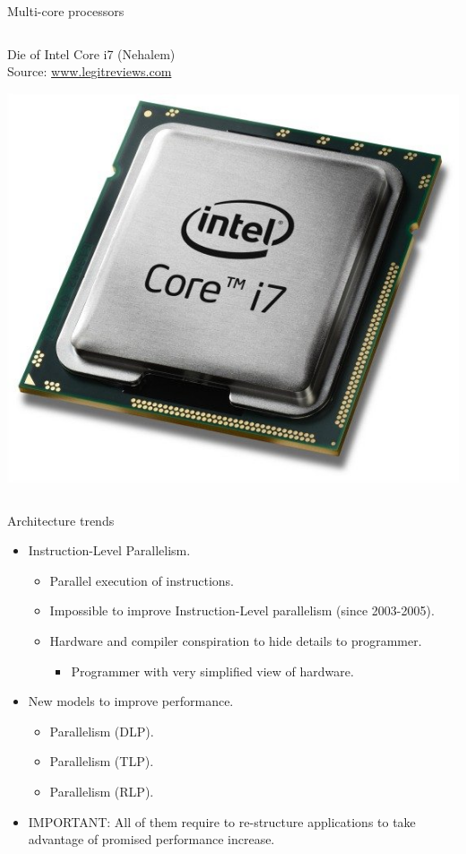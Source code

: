 \begin{frame}[t,shrink=20]{Multi-core processors}
\begin{columns}[T]
\begin{column}{.35\textwidth}
    \begin{tiny}
      Die of Intel Core i7 (Nehalem)\\
      Source: \url{www.legitreviews.com}\\
    \end{tiny}
    \vspace{0.75em}
    \begin{center}
    \includegraphics[width=.45\textwidth]{images/intel-core-i7.jpg}\\
    \end{center}
  \end{column}
\end{columns}
\end{frame}

\begin{frame}[t]{Architecture trends}
\begin{itemize}
  \item Instruction-Level Parallelism.
    \begin{itemize}
      \item Parallel execution of instructions.
      \item Impossible to improve Instruction-Level parallelism (since 2003-2005).
      \item Hardware and compiler conspiration to hide details to programmer.
        \begin{itemize}
          \item Programmer with \alert{very simplified} view of hardware.
        \end{itemize}
    \end{itemize}
  \item New models to improve performance.
    \begin{itemize}
       \item {} Parallelism (DLP).
       \item {} Parallelism (TLP).
       \item {} Parallelism (RLP).
    \end{itemize}
  \item \alert{IMPORTANT}: All of them require to re-structure applications to
        take advantage of promised performance increase.
\end{itemize}
\end{frame}

